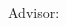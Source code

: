 \begin{titlepage}
	\begin{addmargin}[-1cm]{-3cm}
    \begin{center}
        \large
        \hfill
        \vfill
        \begingroup
            \color{Maroon}\spacedallcaps{\Huge{\myTitle}} \\ \bigskip
        		\color{Black}\mySubtitle \\ \bigskip
        \endgroup
				\vfill
        \spacedlowsmallcaps{\Large{\myName}}
        \vfill

        \myDegree \\ \bigskip
        \myDepartment \\                            
        \myUni \\ 
				\myLocation \\ \bigskip
				\vfill
				Advisor: \myProf
				\vfill
				\myTime
    \end{center}  
  \end{addmargin}       
\end{titlepage}   